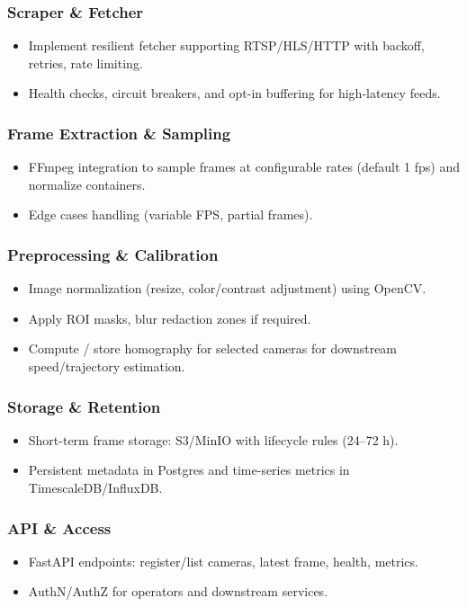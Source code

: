 \subsubsection{Scraper \& Fetcher}
\begin{itemize}
  \item Implement resilient fetcher supporting RTSP/HLS/HTTP with backoff, retries, rate limiting.
  \item Health checks, circuit breakers, and opt-in buffering for high-latency feeds.
\end{itemize}

\subsubsection{Frame Extraction \& Sampling}
\begin{itemize}
  \item FFmpeg integration to sample frames at configurable rates (default 1 fps) and normalize containers.
  \item Edge cases handling (variable FPS, partial frames).
\end{itemize}

\subsubsection{Preprocessing \& Calibration}
\begin{itemize}
  \item Image normalization (resize, color/contrast adjustment) using OpenCV.
  \item Apply ROI masks, blur redaction zones if required.
  \item Compute / store homography for selected cameras for downstream speed/trajectory estimation.
\end{itemize}

\subsubsection{Storage \& Retention}
\begin{itemize}
  \item Short-term frame storage: S3/MinIO with lifecycle rules (24--72 h).
  \item Persistent metadata in Postgres and time-series metrics in TimescaleDB/InfluxDB.
\end{itemize}

\subsubsection{API \& Access}
\begin{itemize}
  \item FastAPI endpoints: register/list cameras, latest frame, health, metrics.
  \item AuthN/AuthZ for operators and downstream services.
\end{itemize}

